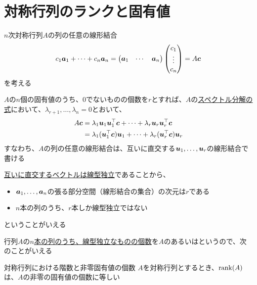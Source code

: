 \documentclass[../../../topic_linear-algebra]{subfiles}
\begin{document}
\sectionline
\section{対称行列のランクと固有値}

$n$次対称行列$A$の列の任意の線形結合
\begin{equation*}
  c_1\vb*{a}_1 + \cdots + c_n\vb*{a}_n = \begin{pmatrix}
    \vb*{a}_1 & \cdots & \vb*{a}_n
  \end{pmatrix} \begin{pmatrix}
    c_1    \\
    \vdots \\
    c_n
  \end{pmatrix} = A\vb*{c}
\end{equation*}
を考える

\br

$A$の$n$個の固有値のうち、0でないものの個数を$r$とすれば、$A$の\hyperref[thm:spectral-decomposition-symmetric]{スペクトル分解の式}において、$\lambda_{r+1}, \ldots, \lambda_n = 0$とおいて、
\begin{align*}
  A\vb*{c} & = \lambda_1\vb*{u}_1\vb*{u}_1^\top\vb*{c} + \cdots + \lambda_r\vb*{u}_r\vb*{u}_r^\top\vb*{c}     \\
           & = \lambda_1(\vb*{u}_1^\top\vb*{c})\vb*{u}_1 + \cdots + \lambda_r(\vb*{u}_r^\top\vb*{c})\vb*{u}_r
\end{align*}
すなわち、$A$の列の任意の線形結合は、互いに直交する$\vb*{u}_1, \ldots, \vb*{u}_r$の線形結合で書ける

\br

\hyperref[thm:orthogonal-set-is-independent]{互いに直交するベクトルは線型独立}であることから、
\begin{itemize}
  \item $\vb*{a}_1, \ldots, \vb*{a}_n$の張る部分空間（線形結合の集合）の次元は$r$である
  \item $n$本の列のうち、$r$本しか線型独立ではない
\end{itemize}
ということがいえる

\br

行列$A$の\hyperref[thm:rank-equals-max-indep-cols]{$n$本の列のうち、線型独立なものの個数}を$A$のあるいはというので、次のことがいえる

\begin{theorem}{対称行列における階数と非零固有値の個数}\label{thm:rank-nonzero-eigenvalues-symmetric}
  $A$を対称行列とするとき、$\rank(A)$は、$A$の非零の固有値の個数に等しい
\end{theorem}
\end{document}
